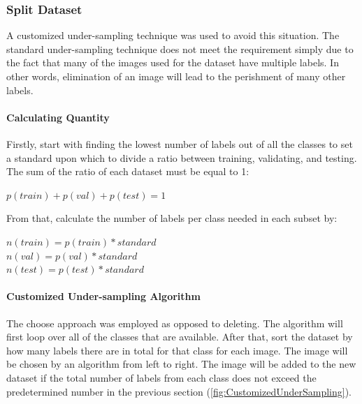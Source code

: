 \subsubsection{Split Dataset}
    A customized under-sampling technique was used to avoid this situation. 
    The standard under-sampling technique does not meet the requirement simply due to the fact that many of the images used for the dataset have multiple labels.
    In other words, elimination of an image will lead to the perishment of many other labels.
    \paragraph{Calculating Quantity}
        Firstly, start with finding the lowest number of labels out of all the classes to set a standard upon which to divide a ratio between training, validating, and testing. The sum of the ratio of each dataset must be equal to 1:\\
        \begin{center}
            \(p(train) + p(val) + p(test) = 1\) 
        \end{center} 
        From that, calculate the number of labels per class needed in each subset by:
        \begin{center}
            \(n(train) = p(train) * standard\) \\
            \(n(val) = p(val) * standard\) \\
            \(n(test) = p(test) * standard\) 
        \end{center} 
    \paragraph{Customized Under-sampling Algorithm}
        The choose approach was employed as opposed to deleting. 
        The algorithm will first loop over all of the classes that are available. 
        After that, sort the dataset by how many labels there are in total for that class for each image. 
        The image will be chosen by an algorithm from left to right. 
        The image will be added to the new dataset if the total number of labels from each class does not exceed the predetermined number in the previous section (\autoref{fig:CustomizedUnderSampling}).